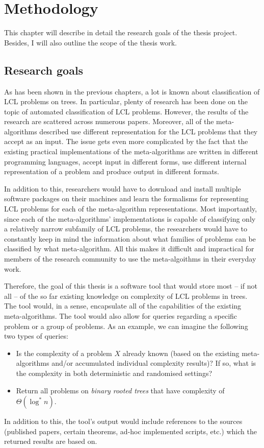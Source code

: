 \chapter{Methodology}
\label{chapter:methods}

This chapter will describe in detail the research goals of the thesis project. Besides, I will also outline the scope of the thesis work.

\section{Research goals}

As has been shown in the previous chapters, a lot is known about classification
of LCL problems on trees. In particular, plenty of research has been done
on the topic of automated classification of LCL problems. However, the
results of the research are scattered across numerous papers. Moreover,
all of the meta-algorithms described use different representation for
the LCL problems that they accept as an input.
The issue gets even more complicated by the fact that the existing practical implementations
of the meta-algorithms are written in different programming languages, accept input in
different forms,
use different internal representation of a problem and produce output in different
formats.

In addition to this, researchers would
have to download and install multiple software packages on their machines and learn
the formalisms for representing LCL problems for each of the meta-algorithm
representations. Most importantly, since each of the meta-algorithms' implementations
is capable of classifying only a relatively narrow subfamily of LCL problems, the
researchers would have to constantly keep in mind the information about what families
of problems can be classified by what meta-algorithm.
All this makes it difficult and impractical for members of
the research community
to use the meta-algoithms in their everyday work.

Therefore, the goal of this thesis is a software tool that would store most -- if not all -- of
the so far existing knowledge on complexity of LCL problems in trees.
The tool would, in a sense, encapsulate all of the capabilities
of the existing meta-algorithms.
The tool would also allow for queries regarding a specific problem or a group of
problems. As an example, we can imagine the following two types of queries:
\begin{itemize}
  \item Is the complexity of a problem $X$ already known (based on the existing meta-algorithms
  and/or accumulated individual complexity results)? If so, what is the complexity in both
  deterministic and randomised settings?
  \item Return all problems on \emph{binary rooted trees} that have complexity of
  $\Theta(\log^* n)$.
\end{itemize}
In addition to this, the tool’s output would include references to
the sources
(published papers, certain theorems, ad-hoc implemented scripts, etc.)
which the returned results are based on.

